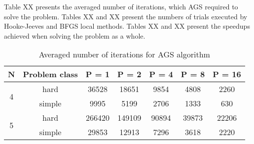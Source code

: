 \documentclass[runningheads]{llncs}
\begin{document}
Table XX presents the averaged number of iterations, which AGS required to solve the problem. Tables XX and XX present the numbers of trials executed by Hooke-Jeeves and BFGS local methods. Tables XX and XX present the speedups achieved when solving the problem as a whole.

\begin{table}[ht]
	\caption{Averaged number of iterations for AGS algorithm}
	\label{tab:5}
	\center
	\begin{tabular}{|c|c|c|c|c|c|c|}
		\hline
		N & Problem class & P = 1 & P = 2 & P = 4 & P = 8 & P = 16 \\
		\hline 
		    \multirow{2}{*}{4} & hard & 36528 & 18651 & 9854 & 4808 & 2260 \\ \cline{2-7}
		                       & simple & 9995 & 5199 & 2706 & 1333 & 630 \\
		\hline
		    \multirow{2}{*}{5} & hard & 266420 & 149109 & 90894 & 39873 & 22206 \\ \cline{2-7}
		                       & simple & 29853 & 12913 & 7296 & 3618 & 2220 \\
		\hline
	\end{tabular}
\end{table}
\end{document}
